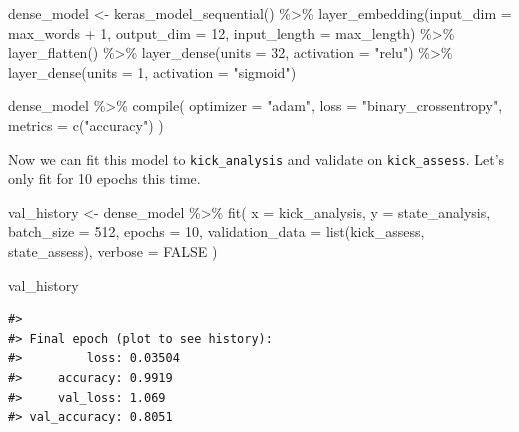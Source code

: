 \documentclass[
]{krantz}
\makeatletter
\newenvironment{Shaded}{\begin{snugshade}}{\end{snugshade}}
\newcommand{\AttributeTok}[1]{\textcolor[rgb]{0.77,0.63,0.00}{#1}}
\newcommand{\ConstantTok}[1]{\textcolor[rgb]{0.00,0.00,0.00}{#1}}
\newcommand{\DecValTok}[1]{\textcolor[rgb]{0.00,0.00,0.81}{#1}}
\newcommand{\FunctionTok}[1]{\textcolor[rgb]{0.00,0.00,0.00}{#1}}
\newcommand{\NormalTok}[1]{#1}
\newcommand{\OtherTok}[1]{\textcolor[rgb]{0.56,0.35,0.01}{#1}}
\newcommand{\SpecialCharTok}[1]{\textcolor[rgb]{0.00,0.00,0.00}{#1}}
\newcommand{\StringTok}[1]{\textcolor[rgb]{0.31,0.60,0.02}{#1}}
\newenvironment{kframe}{%
\medskip{}
\setlength{\fboxsep}{.8em}
 \def\at@end@of@kframe{}%
 \ifinner\ifhmode%
  \def\at@end@of@kframe{\end{minipage}}%
  \begin{minipage}{\columnwidth}%
 \fi\fi%
 \def\FrameCommand##1{\hskip\@totalleftmargin \hskip-\fboxsep
 \colorbox{shadecolor}{##1}\hskip-\fboxsep
     \hskip-\linewidth \hskip-\@totalleftmargin \hskip\columnwidth}%
 \MakeFramed {\advance\hsize-\width
   \@totalleftmargin\z@ \linewidth\hsize
   \@setminipage}}%
 {\par\unskip\endMakeFramed%
 \at@end@of@kframe}
\renewenvironment{Shaded}{\begin{kframe}}{\end{kframe}}
\makeatother
\begin{document}
\begin{Shaded}
\begin{Highlighting}[]
\NormalTok{dense\_model }\OtherTok{\textless{}{-}} \FunctionTok{keras\_model\_sequential}\NormalTok{() }\SpecialCharTok{\%\textgreater{}\%}
  \FunctionTok{layer\_embedding}\NormalTok{(}\AttributeTok{input\_dim =}\NormalTok{ max\_words }\SpecialCharTok{+} \DecValTok{1}\NormalTok{,}
                  \AttributeTok{output\_dim =} \DecValTok{12}\NormalTok{,}
                  \AttributeTok{input\_length =}\NormalTok{ max\_length) }\SpecialCharTok{\%\textgreater{}\%}
  \FunctionTok{layer\_flatten}\NormalTok{() }\SpecialCharTok{\%\textgreater{}\%}
  \FunctionTok{layer\_dense}\NormalTok{(}\AttributeTok{units =} \DecValTok{32}\NormalTok{, }\AttributeTok{activation =} \StringTok{"relu"}\NormalTok{) }\SpecialCharTok{\%\textgreater{}\%}
  \FunctionTok{layer\_dense}\NormalTok{(}\AttributeTok{units =} \DecValTok{1}\NormalTok{, }\AttributeTok{activation =} \StringTok{"sigmoid"}\NormalTok{)}

\NormalTok{dense\_model }\SpecialCharTok{\%\textgreater{}\%} \FunctionTok{compile}\NormalTok{(}
  \AttributeTok{optimizer =} \StringTok{"adam"}\NormalTok{,}
  \AttributeTok{loss =} \StringTok{"binary\_crossentropy"}\NormalTok{,}
  \AttributeTok{metrics =} \FunctionTok{c}\NormalTok{(}\StringTok{"accuracy"}\NormalTok{)}
\NormalTok{)}
\end{Highlighting}
\end{Shaded}

Now we can fit this model to \texttt{kick\_analysis} and validate on \texttt{kick\_assess}. Let's only fit for 10 epochs this time.

\begin{Shaded}
\begin{Highlighting}[]
\NormalTok{val\_history }\OtherTok{\textless{}{-}}\NormalTok{ dense\_model }\SpecialCharTok{\%\textgreater{}\%}
  \FunctionTok{fit}\NormalTok{(}
    \AttributeTok{x =}\NormalTok{ kick\_analysis,}
    \AttributeTok{y =}\NormalTok{ state\_analysis,}
    \AttributeTok{batch\_size =} \DecValTok{512}\NormalTok{,}
    \AttributeTok{epochs =} \DecValTok{10}\NormalTok{,}
    \AttributeTok{validation\_data =} \FunctionTok{list}\NormalTok{(kick\_assess, state\_assess),}
    \AttributeTok{verbose =} \ConstantTok{FALSE}
\NormalTok{  )}

\NormalTok{val\_history}
\end{Highlighting}
\end{Shaded}

\begin{verbatim}
#> 
#> Final epoch (plot to see history):
#>         loss: 0.03504
#>     accuracy: 0.9919
#>     val_loss: 1.069
#> val_accuracy: 0.8051
\end{verbatim}
\end{document}
